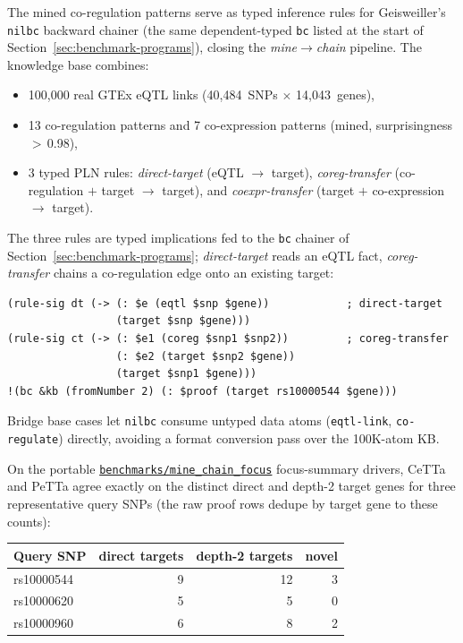 \documentclass[11pt]{article}
\newcommand{\code}[1]{\texttt{#1}}
\newcommand{\PeTTa}{\textup{PeTTa}}
\newcommand{\CeTTa}{\textup{CeTTa}}
\begin{document}
The mined co-regulation patterns serve as typed inference rules for
Geisweiller's \code{nilbc} backward chainer (the same dependent-typed
\code{bc} listed at the start of Section~\ref{sec:benchmark-programs}), closing the
\emph{mine$\to$chain} pipeline.  The knowledge base combines:
\begin{itemize}
\item 100{,}000 real GTEx eQTL links (40{,}484~SNPs $\times$ 14{,}043~genes),
\item 13 co-regulation patterns and 7 co-expression patterns (mined,
  surprisingness $>$\,0.98),
\item 3 typed PLN rules: \emph{direct-target} (eQTL $\to$ target),
  \emph{coreg-transfer} (co-regulation $+$ target $\to$ target), and
  \emph{coexpr-transfer} (target $+$ co-expression $\to$ target).
\end{itemize}
The three rules are typed implications fed to the \code{bc} chainer of
Section~\ref{sec:benchmark-programs}; \emph{direct-target} reads an eQTL
fact, \emph{coreg-transfer} chains a co-regulation edge onto an existing
target:
\begin{lstlisting}[language={},basicstyle=\ttfamily\scriptsize]
(rule-sig dt (-> (: $e (eqtl $snp $gene))            ; direct-target
                 (target $snp $gene)))
(rule-sig ct (-> (: $e1 (coreg $snp1 $snp2))         ; coreg-transfer
                 (: $e2 (target $snp2 $gene))
                 (target $snp1 $gene)))
!(bc &kb (fromNumber 2) (: $proof (target rs10000544 $gene)))
\end{lstlisting}
Bridge base cases let \code{nilbc} consume untyped data atoms
(\code{eqtl-link}, \code{co-regulate}) directly, avoiding a format
conversion pass over the 100K-atom KB\@.

On the portable
\href{https://github.com/zariuq/CeTTa/tree/07928677c0237a19b2f3c32dffca28d7d2626723/benchmarks/mine_chain_focus}{\code{benchmarks/mine\_chain\_focus}}
focus-summary drivers,
\CeTTa{} and \PeTTa{} agree exactly on the distinct direct and depth-2
target genes for three representative query SNPs (the raw proof rows
dedupe by target gene to these counts):

\begin{center}
\begin{tabular}{lrrr}
\toprule
Query SNP & direct targets & depth-2 targets & novel \\
\midrule
rs10000544 & 9 & 12 & 3 \\
rs10000620 & 5 & 5  & 0 \\
rs10000960 & 6 & 8  & 2 \\
\bottomrule
\end{tabular}
\end{center}
\end{document}
